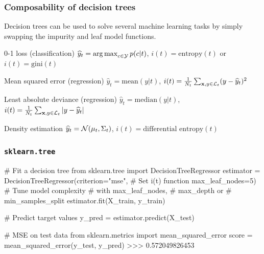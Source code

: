 \documentclass{beamer}
\DeclareMathOperator*{\argmax}{arg\,max}
\begin{document}
\begin{frame}
    \frametitle{Composability of decision trees}

    Decision trees can be used to solve several machine learning tasks by simply swapping the impurity and leaf model functions.

    \vspace{0.5cm}

    \begin{block}{0-1 loss (classification)}
    $\widehat{y}_t = \argmax_{c \in {\cal Y}} p(c|t)$, $i(t) = \text{entropy}(t)$ or $i(t) = \text{gini}(t)$
    \end{block}

    \begin{block}{Mean squared error (regression)}
    $\widehat{y}_t = \text{mean}(y|t)$, $i(t) = \frac{1}{N_t} \sum_{\mathbf{x}, y \in {\cal L}_t} (y - \widehat{y}_t)^2$
    \end{block}

    \begin{block}{Least absolute deviance (regression)}
    $\widehat{y}_t = \text{median}(y|t)$, $i(t) = \frac{1}{N_t} \sum_{\mathbf{x}, y \in {\cal L}_t} |y - \widehat{y}_t|$
    \end{block}

    \begin{block}{Density estimation}
    $\widehat{y}_t = {\cal N}(\mu_t, \Sigma_t)$, $i(t) = \text{differential entropy}(t)$
    \end{block}
\end{frame}

\begin{frame}[fragile]
    \frametitle{\texttt{sklearn.tree}}

{\scriptsize
\begin{pythoncode}
# Fit a decision tree
from sklearn.tree import DecisionTreeRegressor
estimator = DecisionTreeRegressor(criterion="mse",   # Set i(t) function
                                  max_leaf_nodes=5)  # Tune model complexity
                                                     # with max_leaf_nodes,
                                                     # max_depth or
                                                     # min_samples_split
estimator.fit(X_train, y_train)

# Predict target values
y_pred = estimator.predict(X_test)

# MSE on test data
from sklearn.metrics import mean_squared_error
score = mean_squared_error(y_test, y_pred)
>>> 0.572049826453
\end{pythoncode}
}

\end{frame}
\end{document}
